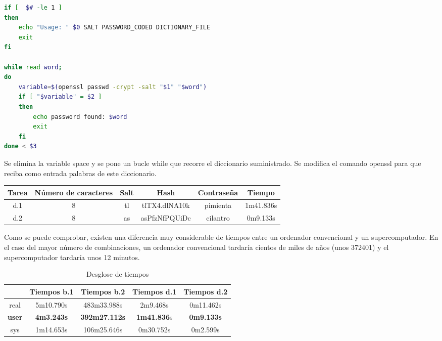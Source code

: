 \documentclass[10pt,a4paper]{article}
\begin{document}
\begin{enumerate}[label=\alph*]
\begin{lstlisting}[language=bash]
if [  $# -le 1 ]
then 
	echo "Usage: " $0 SALT PASSWORD_CODED DICTIONARY_FILE
	exit
fi

while read word;
do
	variable=$(openssl passwd -crypt -salt "$1" "$word")
	if [ "$variable" = $2 ]
	then
		echo password found: $word
		exit
	fi
done < $3
\end{lstlisting}
Se elimina la variable space y se pone un bucle while que recorre el diccionario suministrado. Se modifica el comando openssl para que reciba como entrada palabras de este diccionario.

\begin{center}
  \begin{tabular}{ | c | c | c | c | c | c | }
    \hline
     Tarea & Número de caracteres  & Salt & Hash & Contraseña & Tiempo \\ \hline
     d.1 & 8 & tl & tlTX4.dlNA10k & pimienta & 1m41{.}836s \\ \hline
     d.2 & 8 & as & asPfzNfPQUiDc & cilantro & 0m9{.}133s \\
    \hline
  \end{tabular}
\end{center}

Como se puede comprobar, existen una diferencia muy considerable de tiempos entre un ordenador convencional y un supercomputador. En el caso del mayor número de combinaciones, un ordenador convencional tardaría cientos de miles de años (unos 372401) y el supercomputador tardaría unos 12 minutos.
  
  \begin{table}[h!]
  \centering
    \begin{tabular}{ | c | c | c | c | c | }
    \hline
      & Tiempos b.1 &  Tiempos b.2 & Tiempos d.1  & Tiempos d.2 \\ \hline
     real & 5m10{.}790s & 483m33{.}988s & 2m9{.}468s & 0m11{.}462s \\ \hline
     \textbf{user} & \textbf{4m3{.}243s} & \textbf{392m27{.}112s} & \textbf{1m41{.}836}s & \textbf{0m9{.}133s} \\ \hline
     sys & 1m14{.}653s & 106m25{.}646s & 0m30{.}752s & 0m2{.}599s \\
    \hline

  \end{tabular}
      \caption{Desglose de tiempos}
  \end{table}
  
\end{enumerate}
\end{document}
